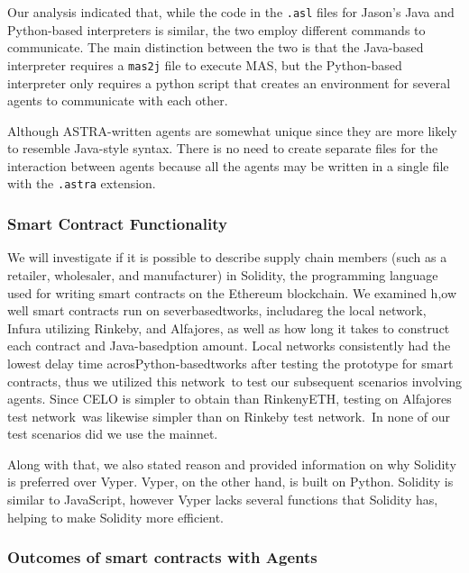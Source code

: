   \vspace{.5cm}

  Our analysis indicated that, while the code in the \texttt{.asl} files for Jason's Java and Python-based interpreters is similar, the two employ different commands to communicate. The main distinction between the two is that the Java-based interpreter requires a \texttt{mas2j} file to execute \ac{MAS}, but the Python-based interpreter only requires a python script that creates an environment for several agents to communicate with each other.
  \vspace{.5cm}

  Although ASTRA-written agents are somewhat unique since they are more likely to resemble Java-style syntax. There is no need to create separate files for the interaction between agents because all the agents may be written in a single file with the \texttt{.astra} extension.
  
\subsubsection{Smart Contract Functionality}
  
  We will investigate if it is possible to describe supply chain members (such as a retailer, wholesaler, and manufacturer) in Solidity, the programming language used for writing smart contracts on the Ethereum blockchain. We examined h,ow well smart contracts run on severbasedtworks, includareg the local network, Infura utilizing Rinkeby, and Alfajores, as well as how long it takes to construct each contract and Java-basedption amount. Local networks consistently had the lowest delay time acrosPython-basedtworks after testing the prototype for smart contracts, thus we utilized this network to test our subsequent scenarios involving agents. Since CELO is simpler to obtain than RinkenyETH, testing on Alfajores test network was likewise simpler than on Rinkeby test network. In none of our test scenarios did we use the mainnet.
  
  \vspace{.5cm}
  
  Along with that, we also stated reason and provided information on why Solidity is preferred over Vyper. Vyper, on the other hand, is built on Python. Solidity is similar to JavaScript, however Vyper lacks several functions that Solidity has, helping to make Solidity more efficient.

\subsubsection{Outcomes of smart contracts with Agents}

